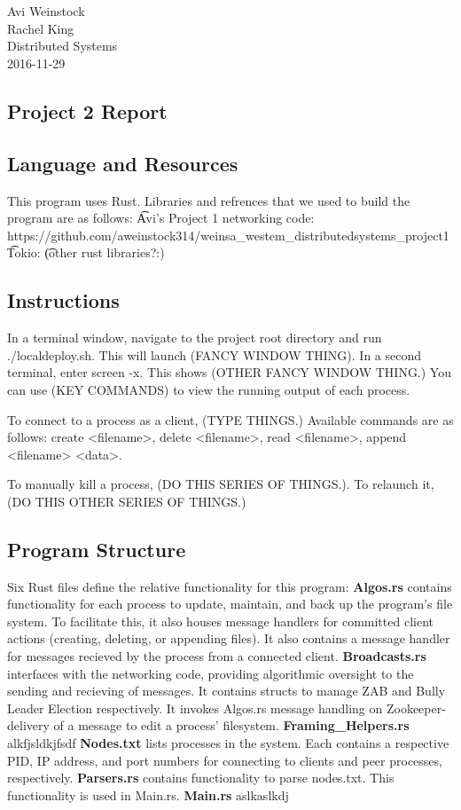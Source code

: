 \documentclass{article}
\begin{document}
\section*{}
Avi Weinstock \\
Rachel King \\
Distributed Systems\\
2016-11-29

\begin{center}
	\section*{Project 2 Report}
\end{center}

\subsection*{Language and Resources}
	This program uses Rust. Libraries and refrences that we used to build the program are as follows: 
	\t Avi's Project 1 networking code: https://github.com/aweinstock314/weinsa_westem_distributedsystems_project1
	\t Tokio:
	\t (other rust libraries?:)
\subsection*{Instructions}
	In a terminal window, navigate to the project root directory and run ./localdeploy.sh. This will launch (FANCY WINDOW THING). In a second terminal, enter screen -x. This shows (OTHER FANCY WINDOW THING.) You can use (KEY COMMANDS) to view the running output of each process. 

	To connect to a process as a client, (TYPE THINGS.) Available commands are as follows: create <filename>, delete <filename>, read <filename>, append <filename> <data>. 

	To manually kill a process, (DO THIS SERIES OF THINGS.). To relaunch it, (DO THIS OTHER SERIES OF THINGS.)

\subsection*{Program Structure}
	Six Rust files define the relative functionality for this program: 
		\t\textbf{Algos.rs} contains functionality for each process to update, maintain, and back up the program's file system. To facilitate this, it also houses message handlers for committed client actions (creating, deleting, or appending files). It also contains a message handler for messages recieved by the process from a connected client. 
		\t\textbf{Broadcasts.rs} interfaces with the networking code, providing algorithmic oversight to the sending and recieving of messages. It contains structs to manage ZAB and Bully Leader Election respectively. It invokes Algos.rs message handling on Zookeeper-delivery of a message to edit a process' filesystem. 
		\t\textbf{Framing_Helpers.rs} alkfjsldkjfsdf
		\t\textbf{Nodes.txt} lists processes in the system. Each contains a respective PID, IP address, and port numbers for connecting to clients and peer processes, respectively.
		\t\textbf{Parsers.rs} contains functionality to parse nodes.txt. This functionality is used in Main.rs. 
		\t\textbf{Main.rs} aslkaslkdj
\end{document}
